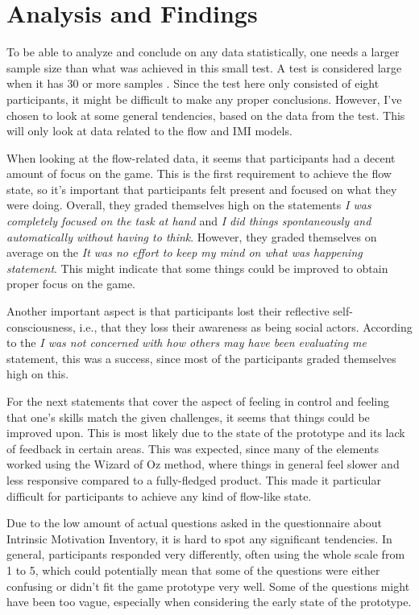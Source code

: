 \chapter{Analysis and Findings}
To be able to analyze and conclude on any data statistically, one needs a larger sample size than what was achieved in this small test. A test is considered large when it has 30 or more samples \citep{statisticsBook}. Since the test here only consisted of eight participants, it might be difficult to make any proper conclusions. However, I've chosen to look at some general tendencies, based on the data from the test. This will only look at data related to the flow and IMI models.

When looking at the flow-related data, it seems that participants had a decent amount of focus on the game. This is the first requirement to achieve the flow state, so it's important that participants felt present and focused on what they were doing. Overall, they graded themselves high on the statements \textit{I was completely focused on the task at hand} and \textit{I did things spontaneously and automatically without having to think}. However, they graded themselves on average on the \textit{It was no effort to keep my mind on what was happening statement}. This might indicate that some things could be improved to obtain proper focus on the game.

Another important aspect is that participants lost their reflective self-consciousness, i.e., that they loss their awareness as being social actors. According to the \textit{I was not concerned with how others may have been evaluating me} statement, this was a success, since most of the participants graded themselves high on this.

For the next statements that cover the aspect of feeling in control and feeling that one's skills match the given challenges, it seems that things could be improved upon. This is most likely due to the state of the prototype and its lack of feedback in certain areas. This was expected, since many of the elements worked using the Wizard of Oz method, where things in general feel slower and less responsive compared to a fully-fledged product. This made it particular difficult for participants to achieve any kind of flow-like state.

Due to the low amount of actual questions asked in the questionnaire about Intrinsic Motivation Inventory, it is hard to spot any significant tendencies. In general, participants responded very differently, often using the whole scale from 1 to 5, which could potentially mean that some of the questions were either confusing or didn't fit the game prototype very well. Some of the questions might have been too vague, especially when considering the early state of the prototype.

